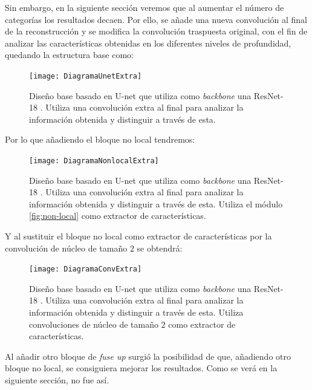 \newpage
Sin embargo, en la siguiente sección veremos que al aumentar el número de categorías los resultados decaen. Por ello, se añade una nueva convolución al final de la reconstrucción y se modifica la convolución traspuesta original, con el fin de analizar las características obtenidas en los diferentes niveles de profundidad, quedando la estructura base como:\\

\begin{figure}[h]
  \centering
  \texttt{[image: DiagramaUnetExtra]}
  \caption{Diseño base basado en U-net \cite{2015arXiv150504597R} que utiliza como \emph{backbone} una ResNet-18 \cite{DBLP:journals/corr/HeZRS15}. Utiliza una convolución extra al final para analizar la información obtenida y distinguir a través de esta.}
  \label{fig:DiagramaUnetExtra}
\end{figure}

\newpage
Por lo que añadiendo el bloque no local tendremos:\\

\begin{figure}[h]
  \centering
  \texttt{[image: DiagramaNonlocalExtra]}
  \caption{Diseño base basado en U-net \cite{2015arXiv150504597R} que utiliza como \emph{backbone} una ResNet-18 \cite{DBLP:journals/corr/HeZRS15}. Utiliza una convolución extra al final para analizar la información obtenida y distinguir a través de esta. Utiliza el módulo \autoref{fig:non-local} como extractor de características.}
  \label{fig:DiagramaNonlocalExtra}
\end{figure}
\newpage
Y al sustituir el bloque no local como extractor de características por la convolución de núcleo de tamaño $2$ se obtendrá:\\

\begin{figure}[h]
  \centering
  \texttt{[image: DiagramaConvExtra]}
  \caption{Diseño base basado en U-net \cite{2015arXiv150504597R} que utiliza como \emph{backbone} una ResNet-18 \cite{DBLP:journals/corr/HeZRS15}. Utiliza una convolución extra al final para analizar la información obtenida y distinguir a través de esta. Utiliza convoluciones de núcleo de tamaño $2$ como extractor de características.}
  \label{fig:DiagramaConvExtra}
\end{figure}

\newpage
Al añadir otro bloque de \emph{fuse up} surgió la posibilidad de que, añadiendo otro bloque no local, se consiguiera mejorar los resultados. Como se verá en la siguiente sección, no fue así.\\

